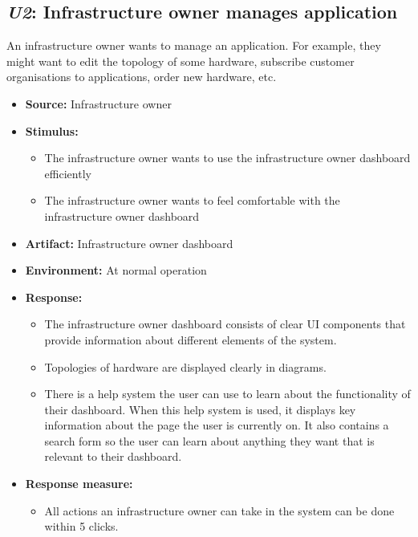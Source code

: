 \subsection{\emph{U2}: Infrastructure owner manages application}
An infrastructure owner wants to manage an application. For example, they
might want to edit the topology of some hardware, subscribe customer
organisations to applications, order new hardware, etc.

\begin{itemize}
    \item \textbf{Source:} Infrastructure owner
    \item \textbf{Stimulus:}
        \begin{itemize}
            \item The infrastructure owner wants to use the infrastructure owner
                  dashboard efficiently
            \item The infrastructure owner wants to feel comfortable with the
                  infrastructure owner dashboard
        \end{itemize}

    \item \textbf{Artifact:} Infrastructure owner dashboard
    \item \textbf{Environment:} At normal operation
    \item \textbf{Response:}
        \begin{itemize}
            \item The infrastructure owner dashboard consists of clear UI
                  components that provide information about different elements of the system.
            \item Topologies of hardware are displayed clearly in diagrams.
            \item There is a help system the user can use to learn about the functionality
                  of their dashboard. When this help system is used, it displays
                  key information about the page the user is currently
                  on. It also contains a search form so the user can learn about
                  anything they want that is relevant to their dashboard.
        \end{itemize}

    \item \textbf{Response measure:}
        \begin{itemize}
            \item All actions an infrastructure owner can take in the system can be
                  done within 5 clicks.
        \end{itemize}
\end{itemize}
